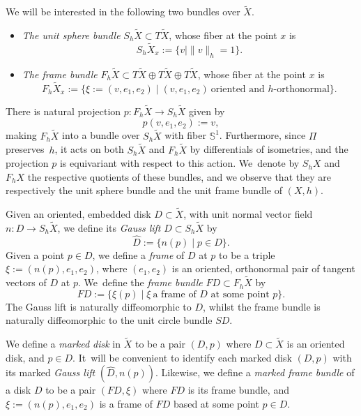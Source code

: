 \documentclass[10pt]{amsart}
\theoremstyle{plain}
\theoremstyle{definition}
\let\dans\subset
\begin{document}
We will be interested in the following two bundles over $\tilde{X}$.
\begin{itemize}
\item \emph{The unit sphere bundle} $S_h\tilde{X}\dans T\tilde{X}$, whose fiber at the point $x$ is
\begin{equation*}
S_h\tilde{X}_x:=\{v\mid \|v\|_h=1\}.
\end{equation*}
\item \emph{The frame bundle} $F_h\tilde{X}\dans T\tilde{X}\oplus T\tilde{X}\oplus T\tilde{X}$, whose fiber at the point $x$ is
\begin{equation*}
F_h\tilde{X}_x:=\{\xi:=(v,e_1,e_2)\mid (v,e_1,e_2)\ \text{oriented and $h$-orthonormal}\}.
\end{equation*}
\end{itemize}
There is natural projection $p:F_h\tilde{X}\to S_h\tilde{X}$ given by
\begin{equation*}
p(v,e_1,e_2):=v,
\end{equation*}
making $F_h\tilde{X}$ into a bundle over $S_h\tilde{X}$ with fiber $\mathbb{S}^1$. Furthermore, since $\Pi$ preserves~$h$, it acts on both $S_h\tilde{X}$ and $F_h\tilde{X}$ by differentials of isometries, and the projection $p$ is equivariant with respect to this action. We~denote by $S_hX$ and $F_hX$ the respective quotients of these bundles, and we observe that they are respectively the unit sphere bundle and the unit frame bundle of $(X,h)$.

Given an oriented, embedded disk $D\dans\tilde{X}$, with unit normal vector field $n:D\to S_h\tilde{X}$, we define its \emph{Gauss lift} $\hat{D}\dans S_h\tilde{X}$ by
\begin{equation*}
\hat{D} := \{n(p)\mid p\in D\}.
\end{equation*}
Given a point $p\in D$, we define a \emph{frame} of $D$ at $p$ to be a triple $\xi:=(n(p),e_1,e_2)$, where $(e_1,e_2)$ is an oriented, orthonormal pair of tangent vectors of $D$ at $p$. We~define the \emph{frame bundle} $FD\dans F_h\tilde{X}$ by
\begin{equation*}
FD := \{\xi(p)\mid \xi\ \text{a frame of $D$ at some point $p$}\}.
\end{equation*}
The Gauss lift is naturally diffeomorphic to $D$, whilst the frame bundle is naturally diffeomorphic to the unit circle bundle $SD$.

We define a \emph{marked disk} in $\tilde{X}$ to be a pair $(D,p)$ where $D\dans\tilde{X}$ is an oriented disk, and $p\in D$. It~will be convenient to identify each marked disk $(D,p)$ with its marked \emph{Gauss lift} $(\hat{D},n(p))$. Likewise, we define a \emph{marked frame bundle} of a disk $D$ to be a pair $(FD,\xi)$ where $FD$ is its frame bundle, and $\xi:=(n(p),e_1,e_2)$ is a frame of $FD$ based at some point $p\in D$.
\end{document}
